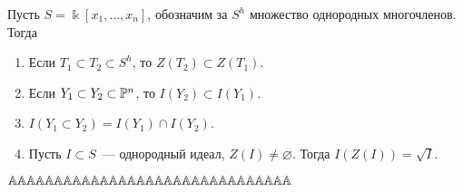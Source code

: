 	\begin{exercise}
 		Пусть $S = \Bbbk[x_1, \ldots, x_n]$, обозначим за $S^h$ множество однородных многочленов. Тогда 
 		\begin{enumerate}
 				 	\item Если $T_1 \subset T_2 \subset S^h$, то $Z(T_2) \subset Z(T_1)$.

 				 	\item Если $Y_1 \subset Y_2 \subset \PP^n$, то $I(Y_2) \subset I(Y_1)$.

 				 	\item $I(Y_1 \subset Y_2) = I(Y_1) \cap I(Y_2)$.

 				 	\item Пусть $I \subset S$~--- однородный идеал, $Z(I) \neq \varnothing$. Тогда $I(Z(I)) = \sqrt{I}$. 
 				 \end{enumerate}		 
	\end{exercise}

	$\AA \AA \AA \AA \AA \AA \AA \AA \AA \AA \AA \AA \AA \AA \AA \AA \AA \AA \AA \AA \AA \AA \AA \AA \AA \AA \AA \AA \AA \AA \AA$
 	








